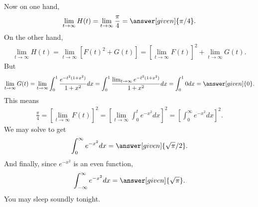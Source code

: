 \documentclass{ximera}
\begin{document}
\begin{exercise}
\begin{exercise}
\begin{exercise}
			Now on one hand,
			\begin{align*}
				\lim_{t \to \infty} H(t) = \lim_{t \to \infty} \frac{\pi}{4} = \answer[given]{\pi/4}.
			\end{align*}
			On the other hand,
			\begin{align*}
				\lim_{t \to \infty} H(t) = \lim_{t \to \infty} \left[ F(t)^2+G(t) \right] = \left[\lim_{t \to \infty} F(t) \right]^2 + \lim_{t \to \infty} G(t).
			\end{align*}
			But
			\begin{align*}
				\lim_{t \to \infty} G(t) = \lim_{t \to \infty} \int_{0}^{1} \frac{e^{-t^2(1+x^2)}}{1+x^2} dx = \int_{0}^{1} \frac{ \lim_{t \to \infty} e^{-t^2(1+x^2)}}{1+x^2} dx = \int_{0}^{1} 0 dx = \answer[given]{0}.
			\end{align*}
			This means
			\begin{align*}
				\frac{\pi}{4} = \left[\lim_{t \to \infty} F(t) \right]^2 = \left[\lim_{t \to \infty} \int_{0}^{t} e^{-x^2} dx \right]^2=\left[ \int_{0}^{\infty} e^{-x^2} dx \right]^2.
			\end{align*}
			We may solve to get
			\begin{align*}
				\int_{0}^{\infty} e^{-x^2} dx = \answer[given]{\sqrt{\pi}/2}.
			\end{align*}			
			And finally, since $e^{-x^2}$ is an even function,
			\begin{align*}
				\int_{-\infty}^{\infty} e^{-x^2} dx = \answer[given]{\sqrt{\pi}}.
			\end{align*}
			You may sleep soundly tonight.
			
			
		\end{exercise}
		
	
	\end{exercise}


\end{exercise}
\end{document}
